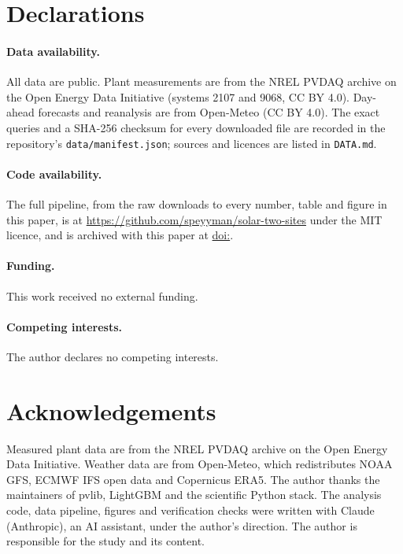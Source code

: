 \documentclass[11pt]{article}
\begin{document}
\section*{Declarations}

\paragraph{Data availability.} All data are public. Plant measurements are from the NREL PVDAQ archive on the Open Energy Data Initiative (systems 2107 and 9068, CC BY 4.0). Day-ahead forecasts and reanalysis are from Open-Meteo (CC BY 4.0). The exact queries and a SHA-256 checksum for every downloaded file are recorded in the repository's \texttt{data/manifest.json}; sources and licences are listed in \texttt{DATA.md}.

\paragraph{Code availability.} The full pipeline, from the raw downloads to every number, table and figure in this paper, is at \url{https://github.com/speyyman/solar-two-sites} under the MIT licence\ifx\paperdoi\empty\else, and is archived with this paper at \href{https://doi.org/\paperdoi}{doi:\paperdoi}\fi.

\paragraph{Funding.} This work received no external funding.

\paragraph{Competing interests.} The author declares no competing interests.

\section*{Acknowledgements}

Measured plant data are from the NREL PVDAQ archive on the Open Energy Data Initiative. Weather data are from Open-Meteo, which redistributes NOAA GFS, ECMWF IFS open data and Copernicus ERA5. The author thanks the maintainers of pvlib, LightGBM and the scientific Python stack. The analysis code, data pipeline, figures and verification checks were written with Claude (Anthropic), an AI assistant, under the author's direction. The author is responsible for the study and its content.
\end{document}
